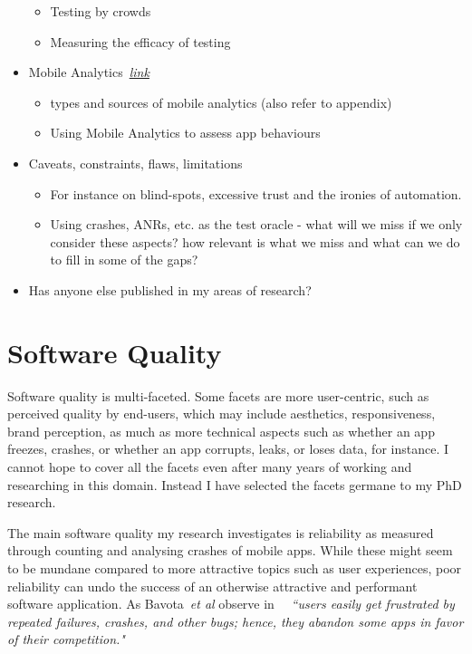 \begin{itemize}
\begin{itemize}
        \item Testing by crowds
        \item Measuring the efficacy of testing
    \end{itemize}
    \item Mobile Analytics~\hyperlink{mobile.analytics}{\emph{link}}
    \begin{itemize}
        \item types and sources of mobile analytics (also refer to appendix)
        \item Using Mobile Analytics to assess app behaviours
    \end{itemize}
    \item Caveats, constraints, flaws, limitations
    \begin{itemize}
        \item For instance on blind-spots, excessive trust and the ironies of automation. 
        \item Using crashes, ANRs, etc. as the test oracle - what will we miss if we only consider these aspects? how relevant is what we miss and what can we do to fill in some of the gaps?
    \end{itemize}
    \item Has anyone else published in my areas of research?
\end{itemize}

\hypertarget{software.quality}{}
\section{Software Quality}
Software quality is multi-faceted. Some facets are more user-centric, such as perceived quality by end-users, which may include aesthetics, responsiveness, brand perception, as much as more technical aspects such as whether an app freezes, crashes, or whether an app corrupts, leaks, or loses data, for instance. I cannot hope to %
cover all the facets even after many years of working and researching in this domain. Instead I have selected the facets germane to my PhD research.

The main software quality my research investigates is reliability as measured through counting and analysing crashes of mobile apps. While these might seem to be mundane compared to more attractive topics such as user experiences, poor reliability can undo the success of an otherwise attractive and performant software application. As Bavota~\emph{et al} observe in~\cite{bavota2014_impact_of_api_change_android} ~\emph{``users easily get frustrated by repeated failures, crashes, and other bugs; hence, they abandon some apps in favor of their competition."} 

